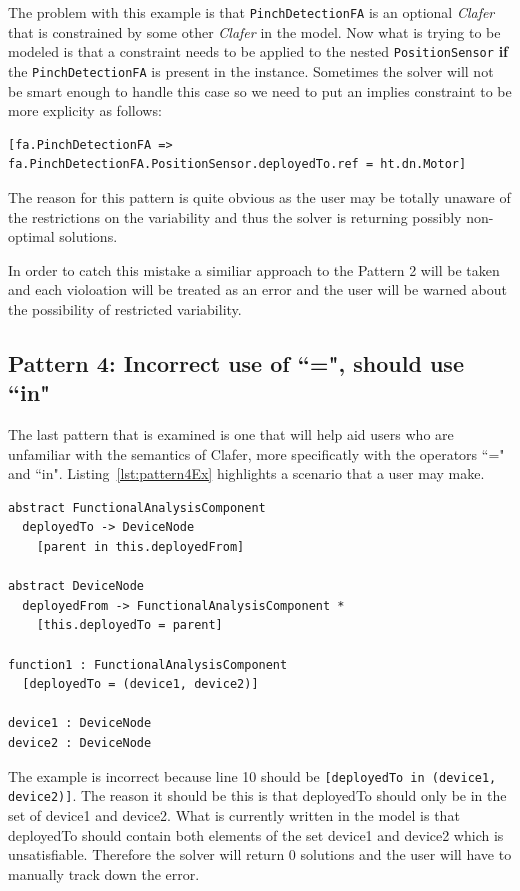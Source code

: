 \documentclass[10pt,oneside]{IEEEtran}
\begin{document}
The problem with this example is that \lstinline$PinchDetectionFA$ is an optional \textit{Clafer} that is constrained by some other \textit{Clafer} in the model. Now what is trying to be modeled is that a constraint needs to be applied to the nested \lstinline$PositionSensor$ \textbf{if} the \lstinline$PinchDetectionFA$ is present in the instance. Sometimes the solver will not be smart enough to handle this case so we need to put an implies constraint to be more explicity as follows:
\begin{lstlisting}[]
[fa.PinchDetectionFA => fa.PinchDetectionFA.PositionSensor.deployedTo.ref = ht.dn.Motor]
\end{lstlisting}

The reason for this pattern is quite obvious as the user may be totally unaware of the restrictions on the variability and thus the solver is returning possibly non-optimal solutions.

In order to catch this mistake a similiar approach to the Pattern 2 will be taken and each violoation will be treated as an error and the user will be warned about the possibility of restricted variability.

\subsection{Pattern 4: Incorrect use of ``=", should use ``in"}
The last pattern that is examined is one that will help aid users who are unfamiliar with the semantics of Clafer, more specificatly with the operators ``=" and ``in". Listing~\ref{lst:pattern4Ex} highlights a scenario that a user may make.
\begin{lstlisting}[label={lst:pattern4Ex},caption={Example of Pattern 4},numbers=right]
abstract FunctionalAnalysisComponent
  deployedTo -> DeviceNode
    [parent in this.deployedFrom]

abstract DeviceNode
  deployedFrom -> FunctionalAnalysisComponent *
    [this.deployedTo = parent]

function1 : FunctionalAnalysisComponent
  [deployedTo = (device1, device2)]

device1 : DeviceNode
device2 : DeviceNode
\end{lstlisting}

The example is incorrect because line 10 should be \lstinline$[deployedTo in (device1, device2)]$. The reason it should be this is that deployedTo should only be in the set of device1 and device2. What is currently written in the model is that deployedTo should contain both elements of the set device1 and device2 which is unsatisfiable. Therefore the solver will return 0 solutions and the user will have to manually track down the error.
\end{document}
